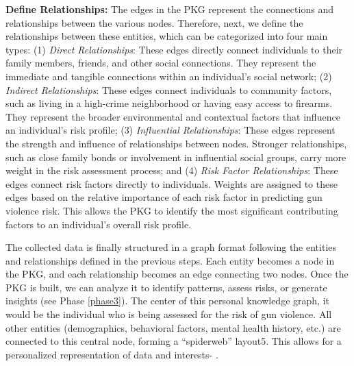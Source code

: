 \documentclass[11pt]{article}
\begin{document}
\textbf{Define Relationships: }The edges in the PKG represent the connections and relationships between the various nodes. Therefore, next, we define the relationships between these entities, which can be categorized into four main types: (1) \textit{Direct Relationships}: These edges directly connect individuals to their family members, friends, and other social connections. They represent the immediate and tangible connections within an individual's social network; (2) \textit{Indirect Relationships}: These edges connect individuals to community factors, such as living in a high-crime neighborhood or having easy access to firearms. They represent the broader environmental and contextual factors that influence an individual's risk profile; 
(3) \textit{Influential Relationships}: These edges represent the strength and influence of relationships between nodes. Stronger relationships, such as close family bonds or involvement in influential social groups, carry more weight in the risk assessment process; and (4) 
\textit{Risk Factor Relationships}: These edges connect risk factors directly to individuals. Weights are assigned to these edges based on the relative importance of each risk factor in predicting gun violence risk. This allows the PKG to identify the most significant contributing factors to an individual's overall risk profile.

The collected data is finally structured in a graph format following the entities and relationships defined in the previous steps. Each entity becomes a node in the PKG, and each relationship becomes an edge connecting two nodes. Once the PKG is built, we can analyze it to identify patterns, assess risks, or generate insights (see Phase \ref{phase3}). The center of this personal knowledge graph, it would be the individual who is being assessed for the risk of gun violence\cite{ilkou2022personal}. All other entities (demographics, behavioral factors, mental health history, etc.) are connected to this central node, forming a ``spiderweb'' layout5. This allows for a personalized representation of data and interests- \cite{balog2019personal,ilkou2022personal,chakraborty2022personal}.



\end{document}
